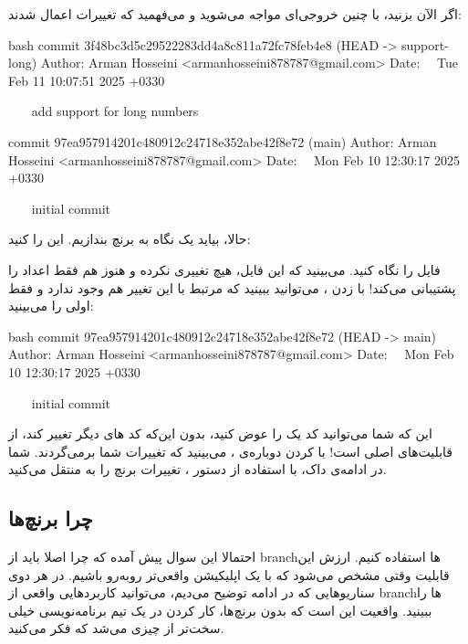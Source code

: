 اگر الآن  بزنید، با چنین خروجی‌ای مواجه می‌شوید و
می‌فهمید که تغییرات اعمال شدند:

\begin{codebox}{bash}
commit 3f48bc3d5c29522283dd4a8c811a72fc78feb4e8 (HEAD -> support-long)  
Author: Arman Hosseini <armanhosseini878787@gmail.com>  
Date:   Tue Feb 11 10:07:51 2025 +0330  
  
    add support for long numbers  
  
commit 97ea957914201c480912c24718e352abe42f8e72 (main)  
Author: Arman Hosseini <armanhosseini878787@gmail.com>  
Date:   Mon Feb 10 12:30:17 2025 +0330  
  
    initial commit
\end{codebox}

حالا، بیاید یک نگاه به برنچ  بندازیم. این 
را  کنید:


فایل  را نگاه کنید. می‌بینید که این فایل، هیچ
تغییری نکرده و هنوز هم فقط اعداد  را پشتیبانی می‌کند! با
زدن ، می‌توانید ببینید که  مرتبط با این
تغییر هم وجود ندارد و فقط  اولی‌ را می‌بینید:

\begin{codebox}{bash}
commit 97ea957914201c480912c24718e352abe42f8e72 (HEAD -> main)  
Author: Arman Hosseini <armanhosseini878787@gmail.com>  
Date:   Mon Feb 10 12:30:17 2025 +0330  
  
    initial commit
\end{codebox}

این که شما می‌توانید کد یک  را عوض کنید، بدون این‌که کد
 های دیگر تغییر کند، از قابلیت‌های اصلی‌  است! با
 کردن دوباره‌ی ، می‌بینید که
تغییرات شما برمی‌گردند. شما در ادامه‌ی داک، با استفاده از دستور
، تغییرات برنچ  را به
 منتقل می‌کنید.

\subsection{چرا برنچ‌ها}

احتمالا این سوال پیش آمده که چرا اصلا باید از branch‌ها استفاده کنیم.
ارزش این قابلیت وقتی مشخص می‌شود که با یک اپلیکیشن واقعی‌تر رو‌به‌رو باشیم.
در هر دوی سناریوهایی که در ادامه توضیح می‌دیم، می‌توانید کاربردهایی واقعی
از branch‌ها را ببینید. واقعیت این است که بدون برنچ‌ها، کار کردن در یک تیم
برنامه‌نویسی خیلی سخت‌تر از چیزی می‌شد که فکر می‌کنید.

